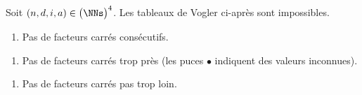 \begin{fact} \label{illegal-vogler}
	Soit $(n, d, i, a) \in \big( \NNs \big)^4$.
	Les tableaux de Vogler ci-après sont impossibles. 


	\begin{enumerate}
		\item Pas de facteurs carrés consécutifs.
	\end{enumerate}
		
    \begin{center}
    \end{center}


	\begin{enumerate}[start=2]
		\item Pas de facteurs carrés trop près (les puces $\bullet$ indiquent des valeurs inconnues).
	\end{enumerate}
		
    \begin{center}
    \end{center}


	\begin{enumerate}[start=3]
		\item Pas de facteurs carrés pas trop loin.
	\end{enumerate}
		
    \begin{center}
    \end{center}
\end{fact}


